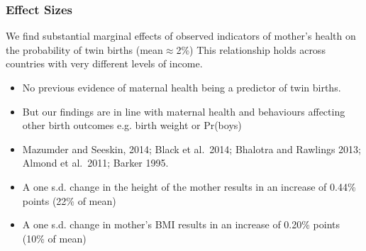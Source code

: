 \documentclass[9pt,letterpaper,subeqn]{beamer}
\begin{document}

\begin{frame}[label=robust]
\frametitle{Effect Sizes}
We find substantial marginal effects of observed indicators of mother’s health on the probability of twin births (mean$\approx$2\%)
This relationship holds across countries with very different levels of income.
\begin{itemize}
\item No previous evidence of maternal health being a predictor of twin births.
\item But our findings are in line with maternal health and behaviours affecting other birth outcomes e.g. birth weight or Pr(boys) 
\item Mazumder and Seeskin, 2014; Black et al.\ 2014;  Bhalotra and Rawlings 2013; Almond et al.\ 2011; Barker 1995.\vspace{6mm}
\item A one s.d. change in the height of the mother results in an increase of 0.44\% points (22\% of mean)
\item A one s.d. change in mother's BMI results in an increase of 0.20\% points (10\% of mean)\\ \vspace{5mm}
\end{itemize}
\end{frame}



\end{document}
